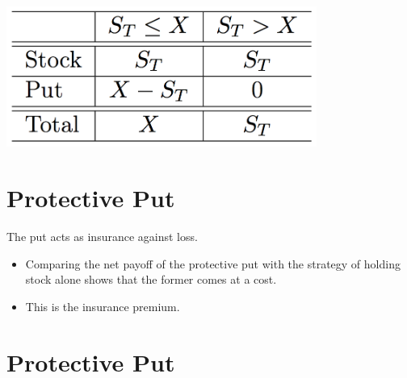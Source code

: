 \documentclass[letterpaper,10pt,english]{sphinxmanual}
\begin{document}
$\qquad$

{\hfill\includegraphics[width=4in]{table3.png}\hfill}


\section{Protective Put}
\label{options:id18}
The put acts as insurance against loss.
\begin{itemize}
\item {} 
Comparing the net payoff of the protective put with the strategy of
holding stock alone shows that the former comes at a cost.

\end{itemize}
\begin{itemize}
\item {} 
This is the insurance premium.

\end{itemize}


\section{Protective Put}
\label{options:id19}
$\qquad$
\end{document}
